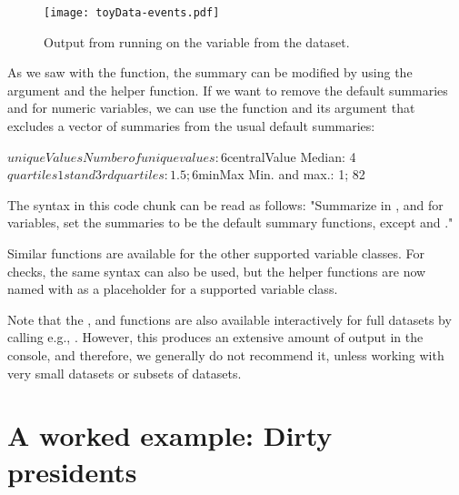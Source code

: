 \documentclass[article,shortnames]{jss}
\begin{document}
\begin{figure}[tb]
\begin{center}
\texttt{[image: toyData-events.pdf]}
\end{center}
\caption{Output from running  on the variable  from the
 dataset.}
\label{fig:example3}
\end{figure}


As we saw with the  function, the summary can be modified
by using the  argument and the  helper function. If we want to remove the default summaries  and  for numeric variables, we can use the function  and its argument  that excludes a vector of summaries from the usual default summaries:


\begin{Schunk}
\begin{Soutput}
$uniqueValues
Number of unique values: 6
$centralValue
Median: 4
$quartiles
1st and 3rd quartiles: 1.5; 6
$minMax
Min. and max.: 1; 82
\end{Soutput}
\end{Schunk}

The syntax in this code chunk can be read as follows: "Summarize  in , and for  variables, set the summaries to be the default summary functions, except  and ." 

Similar  functions are available for the other supported variable classes. For checks, the same syntax can also be used, but the helper functions are now named  with  as a placeholder for a supported variable class.

Note that the ,  and  functions are also available interactively for full datasets by calling e.g., . However, this produces an extensive amount of output in the console, and therefore, we generally do not recommend it, unless working with very small datasets or subsets of datasets.

\section{A worked example: Dirty presidents} 
\label{sec:bigExample}
\end{document}
